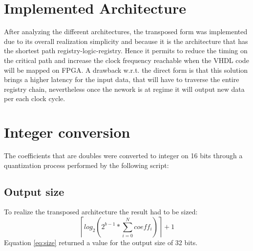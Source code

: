 \section{Implemented Architecture}
After analyzing the different architectures, the transposed form was implemented due to its overall realization simplicity and because it is the architecture that has the shortest path registry-logic-registry. Hence it permits to reduce the timing on the critical path and increase the clock frequency reachable when the VHDL code will be mapped on FPGA. A drawback w.r.t. the direct form is that this solution brings a higher latency for the input data, that will have to traverse the entire registry chain, nevertheless once the nework is at regime it will output new data per each clock cycle.
\section{Integer conversion}
The coefficients that are doubles were converted to integer on 16 bits through a quantization process performed by the following script:

\subsection{Output size}
\label{sec:sizing}
To realize the transposed architecture the result had to be sized:
\begin{equation}
	\label{eq:size}
	\left \lceil log_2(2^{b-1}*\sum_{i=0}^{N} coeff_i)\right \rceil	+1
\end{equation}
Equation \ref{eq:size} returned a value for the output size of 32 bits.
\clearpage